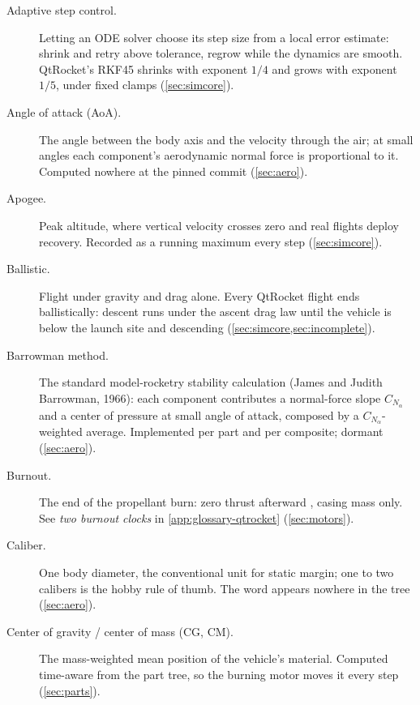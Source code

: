 \begin{description}

\item[Adaptive step control.] Letting an ODE solver choose its step size from a local error
  estimate: shrink and retry above tolerance, regrow while the dynamics are smooth.
  QtRocket's RKF45 shrinks with exponent $1/4$ and grows with exponent $1/5$, under fixed
  clamps  (\cref{sec:simcore}).

\item[Angle of attack (AoA).] The angle between the body axis and the velocity through the
  air; at small angles each component's aerodynamic normal force is proportional to it.
  Computed nowhere at the pinned commit (\cref{sec:aero}).

\item[Apogee.] Peak altitude, where vertical velocity crosses zero and real flights deploy
  recovery. Recorded as a running maximum every step 
  (\cref{sec:simcore}).

\item[Ballistic.] Flight under gravity and drag alone. Every QtRocket flight ends
  ballistically: descent runs under the ascent drag law until the vehicle is below the
  launch site and descending 
  (\cref{sec:simcore,sec:incomplete}).

\item[Barrowman method.] The standard model-rocketry stability calculation (James and
  Judith Barrowman, 1966): each component contributes a normal-force slope $C_{N_\alpha}$
  and a center of pressure at small angle of attack, composed by a $C_{N_\alpha}$-weighted
  average. Implemented per part and per composite; dormant (\cref{sec:aero}).

\item[Burnout.] The end of the propellant burn: zero thrust afterward
  , casing mass only. See \emph{two burnout clocks} in
  \cref{app:glossary-qtrocket} (\cref{sec:motors}).

\item[Caliber.] One body diameter, the conventional unit for static margin; one to two
  calibers is the hobby rule of thumb. The word appears nowhere in the tree
  (\cref{sec:aero}).

\item[Center of gravity / center of mass (CG, CM).] The mass-weighted mean position of the
  vehicle's material. Computed time-aware from the part tree, so the burning motor moves it
  every step  (\cref{sec:parts}).


\end{description}
